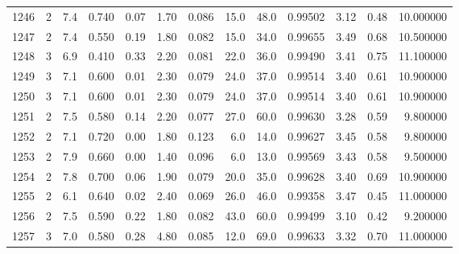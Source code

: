 \begin{tabular}{lrrrrrrrrrrrr}
1246 &        2 &            7.4 &             0.740 &         0.07 &            1.70 &      0.086 &                 15.0 &                  48.0 &  0.99502 &  3.12 &       0.48 &  10.000000 \\
1247 &        2 &            7.4 &             0.550 &         0.19 &            1.80 &      0.082 &                 15.0 &                  34.0 &  0.99655 &  3.49 &       0.68 &  10.500000 \\
1248 &        3 &            6.9 &             0.410 &         0.33 &            2.20 &      0.081 &                 22.0 &                  36.0 &  0.99490 &  3.41 &       0.75 &  11.100000 \\
1249 &        3 &            7.1 &             0.600 &         0.01 &            2.30 &      0.079 &                 24.0 &                  37.0 &  0.99514 &  3.40 &       0.61 &  10.900000 \\
1250 &        3 &            7.1 &             0.600 &         0.01 &            2.30 &      0.079 &                 24.0 &                  37.0 &  0.99514 &  3.40 &       0.61 &  10.900000 \\
1251 &        2 &            7.5 &             0.580 &         0.14 &            2.20 &      0.077 &                 27.0 &                  60.0 &  0.99630 &  3.28 &       0.59 &   9.800000 \\
1252 &        2 &            7.1 &             0.720 &         0.00 &            1.80 &      0.123 &                  6.0 &                  14.0 &  0.99627 &  3.45 &       0.58 &   9.800000 \\
1253 &        2 &            7.9 &             0.660 &         0.00 &            1.40 &      0.096 &                  6.0 &                  13.0 &  0.99569 &  3.43 &       0.58 &   9.500000 \\
1254 &        2 &            7.8 &             0.700 &         0.06 &            1.90 &      0.079 &                 20.0 &                  35.0 &  0.99628 &  3.40 &       0.69 &  10.900000 \\
1255 &        2 &            6.1 &             0.640 &         0.02 &            2.40 &      0.069 &                 26.0 &                  46.0 &  0.99358 &  3.47 &       0.45 &  11.000000 \\
1256 &        2 &            7.5 &             0.590 &         0.22 &            1.80 &      0.082 &                 43.0 &                  60.0 &  0.99499 &  3.10 &       0.42 &   9.200000 \\
1257 &        3 &            7.0 &             0.580 &         0.28 &            4.80 &      0.085 &                 12.0 &                  69.0 &  0.99633 &  3.32 &       0.70 &  11.000000 \\

\end{tabular}

